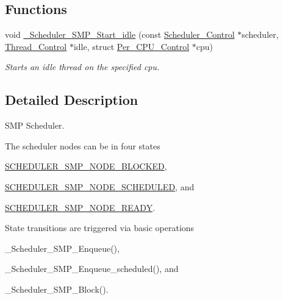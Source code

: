 \subsection*{Functions}
\begin{DoxyCompactItemize}
\item 
void \mbox{\hyperlink{group__RTEMSScoreSchedulerSMP_gafdf411aaced58680690f4ad49e4b1e9d}{\+\_\+\+Scheduler\+\_\+\+S\+M\+P\+\_\+\+Start\+\_\+idle}} (const \mbox{\hyperlink{struct__Scheduler__Control}{Scheduler\+\_\+\+Control}} $\ast$scheduler, \mbox{\hyperlink{struct__Thread__Control}{Thread\+\_\+\+Control}} $\ast$idle, struct \mbox{\hyperlink{structPer__CPU__Control}{Per\+\_\+\+C\+P\+U\+\_\+\+Control}} $\ast$cpu)
\begin{DoxyCompactList}\small\item\em Starts an idle thread on the specified cpu. \end{DoxyCompactList}\end{DoxyCompactItemize}


\subsection{Detailed Description}
S\+MP Scheduler. 

The scheduler nodes can be in four states
\begin{DoxyItemize}
\item \mbox{\hyperlink{group__RTEMSScoreSchedulerSMP_ggae8abff79029e8e3da109701348c4eccdabba8661884021992acaac8ac523c7069}{S\+C\+H\+E\+D\+U\+L\+E\+R\+\_\+\+S\+M\+P\+\_\+\+N\+O\+D\+E\+\_\+\+B\+L\+O\+C\+K\+ED}},
\item \mbox{\hyperlink{group__RTEMSScoreSchedulerSMP_ggae8abff79029e8e3da109701348c4eccdac4d10bb2c8414a73604c79e008b18333}{S\+C\+H\+E\+D\+U\+L\+E\+R\+\_\+\+S\+M\+P\+\_\+\+N\+O\+D\+E\+\_\+\+S\+C\+H\+E\+D\+U\+L\+ED}}, and
\item \mbox{\hyperlink{group__RTEMSScoreSchedulerSMP_ggae8abff79029e8e3da109701348c4eccda68a173288a0e73643766bc38d4f2484b}{S\+C\+H\+E\+D\+U\+L\+E\+R\+\_\+\+S\+M\+P\+\_\+\+N\+O\+D\+E\+\_\+\+R\+E\+A\+DY}}.
\end{DoxyItemize}

State transitions are triggered via basic operations
\begin{DoxyItemize}
\item \+\_\+\+Scheduler\+\_\+\+S\+M\+P\+\_\+\+Enqueue(),
\item \+\_\+\+Scheduler\+\_\+\+S\+M\+P\+\_\+\+Enqueue\+\_\+scheduled(), and
\item \+\_\+\+Scheduler\+\_\+\+S\+M\+P\+\_\+\+Block().
\end{DoxyItemize}



